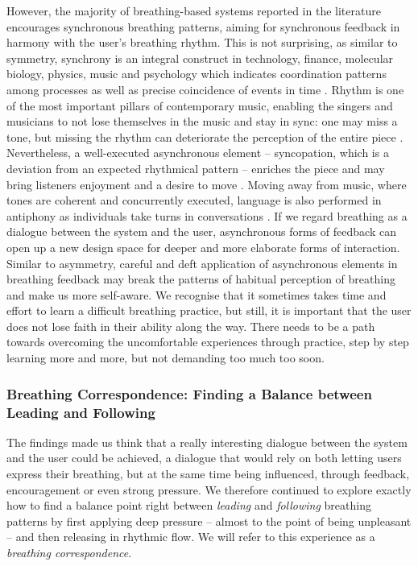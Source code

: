 However, the majority of breathing-based systems reported in the literature encourages synchronous breathing patterns, aiming for synchronous feedback in harmony with the user's breathing rhythm. This is not surprising, as similar to symmetry, synchrony is an integral construct in technology, finance, molecular biology, physics, music and psychology which indicates coordination patterns among processes as well as precise coincidence of events in time \cite{ravignani_chorusing_2014}. Rhythm is one of the most important pillars of contemporary music, enabling the singers and musicians to not lose themselves in the music and stay in sync: one may miss a tone, but missing the rhythm can deteriorate the perception of the entire piece \cite{levitin_this_2019, reich_writings_2004}. Nevertheless, a well-executed asynchronous element -- syncopation, which is a deviation from an expected rhythmical pattern -- enriches the piece and may bring listeners enjoyment and a desire to move \cite{sioros_syncopation_2014}. Moving away from music, where tones are coherent and concurrently executed, language is also performed in antiphony as individuals take turns in conversations \cite{ravignani_chorusing_2014}. If we regard breathing as a dialogue between the system and the user, asynchronous forms of feedback can open up a new design space for deeper and more elaborate forms of interaction. Similar to asymmetry, careful and deft application of asynchronous elements in breathing feedback may break the patterns of habitual perception of breathing and make us more self-aware.
We recognise that it sometimes takes time and effort to learn a difficult breathing practice, but still, it is important that the user does not lose faith in their ability along the way. There needs to be a path towards overcoming the uncomfortable experiences through practice, step by step learning more and more, but not demanding too much too soon.

\subsubsection{Breathing Correspondence: Finding a Balance between Leading and Following}

The findings made us think that a really interesting dialogue between the system and the user could be achieved, a dialogue that would rely on both letting users express their breathing, but at the same time being influenced, through feedback, encouragement or even strong pressure. We therefore continued to explore exactly how to find a balance point right between \textit{leading} and \textit{following} breathing patterns by first applying deep pressure -- almost to the point of being unpleasant -- and then releasing in rhythmic flow. We will refer to this experience as a \textit{breathing correspondence}.


